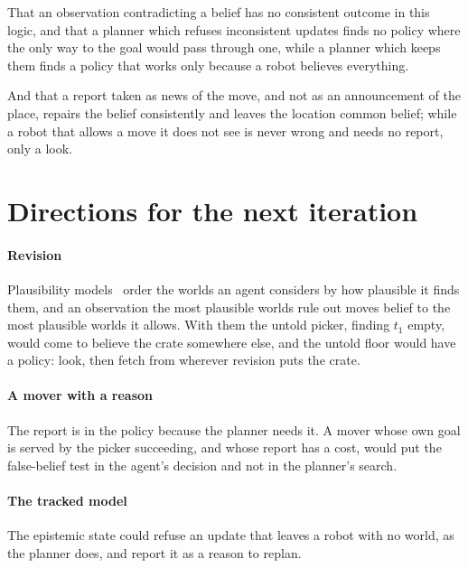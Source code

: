 \documentclass[11pt,a4paper]{article}
\theoremstyle{definition}
\begin{document}
That an observation contradicting a belief has no consistent outcome in this
logic, and that a planner which refuses inconsistent updates finds no policy
where the only way to the goal would pass through one, while a planner which
keeps them finds a policy that works only because a robot believes everything.

And that a report taken as news of the move, and not as an announcement of the
place, repairs the belief consistently and leaves the location common belief;
while a robot that allows a move it does not see is never wrong and needs no
report, only a look.

\section{Directions for the next iteration}
\label{sec:next}

\paragraph{Revision} Plausibility models~\cite{baltag2008} order the worlds an
agent considers by how plausible it finds them, and an observation the most
plausible worlds rule out moves belief to the most plausible worlds it allows.
With them the untold picker, finding $t_1$ empty, would come to believe the
crate somewhere else, and the untold floor would have a policy: look, then
fetch from wherever revision puts the crate.

\paragraph{A mover with a reason} The report is in the policy because the
planner needs it. A mover whose own goal is served by the picker succeeding,
and whose report has a cost, would put the false-belief test in the agent's
decision and not in the planner's search.

\paragraph{The tracked model} The epistemic state could refuse an update that
leaves a robot with no world, as the planner does, and report it as a reason to
replan.
\end{document}
